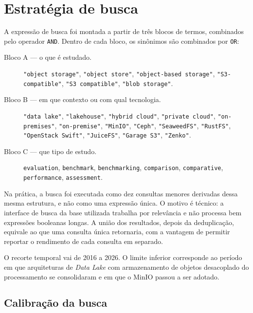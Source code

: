 \section{Estratégia de busca}
\label{sec:estrategia-busca}

A expressão de busca foi montada a partir de três blocos de termos, combinados
pelo operador \texttt{AND}. Dentro de cada bloco, os sinônimos são combinados
por \texttt{OR}:

\begin{description}
    \item[Bloco A --- o que é estudado.] \texttt{"object storage"},
          \texttt{"object store"}, \texttt{"object-based storage"},
          \texttt{"S3-compatible"}, \texttt{"S3 compatible"},
          \texttt{"blob storage"}.

    \item[Bloco B --- em que contexto ou com qual tecnologia.]
          \texttt{"data lake"}, \texttt{"lakehouse"}, \texttt{"hybrid cloud"},
          \texttt{"private cloud"}, \texttt{"on-premises"},
          \texttt{"on-premise"}, \texttt{"MinIO"}, \texttt{"Ceph"},
          \texttt{"SeaweedFS"}, \texttt{"RustFS"}, \texttt{"OpenStack Swift"},
          \texttt{"JuiceFS"}, \texttt{"Garage S3"}, \texttt{"Zenko"}.

    \item[Bloco C --- que tipo de estudo.] \texttt{evaluation},
          \texttt{benchmark}, \texttt{benchmarking}, \texttt{comparison},
          \texttt{comparative}, \texttt{performance}, \texttt{assessment}.
\end{description}

Na prática, a busca foi executada como dez consultas menores derivadas dessa
mesma estrutura, e não como uma expressão única. O motivo é técnico: a interface
de busca da base utilizada trabalha por relevância e não processa bem expressões
booleanas longas. A união dos resultados, depois da deduplicação, equivale ao
que uma consulta única retornaria, com a vantagem de permitir reportar o
rendimento de cada consulta em separado.

O recorte temporal vai de 2016 a 2026. O limite inferior corresponde ao período
em que arquiteturas de \textit{Data Lake} com armazenamento de objetos
desacoplado do processamento se consolidaram e em que o MinIO passou a ser
adotado.

\subsection{Calibração da busca}

